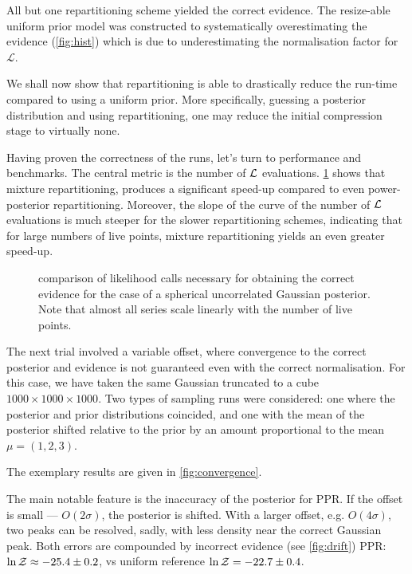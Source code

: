 \documentclass[usenatbib]{mnras}
\begin{document}
All but one repartitioning scheme yielded the correct evidence. The
resize-able uniform prior model was constructed to systematically
overestimating the evidence (\cref{fig:hist}) which is due to
underestimating the normalisation factor for
\(\mathcal{L}\).


We shall now show that repartitioning is able to drastically reduce
the run-time compared to using a uniform prior. More specifically,
guessing a posterior distribution and using repartitioning, one may
reduce the initial compression stage to virtually none.

Having proven the correctness of the runs, let's turn to performance
and benchmarks. The central metric is the number of \({\cal L}\)
evaluations. \cref{fig:benchmark} shows that mixture
repartitioning, produces a significant speed-up compared to even
power-posterior repartitioning. Moreover, the slope of the curve of
the number of \({\cal L}\) evaluations is much steeper for the
slower repartitioning schemes, indicating that for large numbers of
live points, mixture repartitioning yields an even greater
speed-up.



\begin{figure}
  
\caption{comparison of likelihood calls necessary for obtaining the correct evidence for the case of a spherical uncorrelated Gaussian posterior. Note that almost all series scale linearly with the number of live points. \label{fig:benchmark}}
\end{figure}




The next trial involved a variable offset, where convergence to the
correct posterior and evidence is not guaranteed even with the correct
normalisation. For this case, we have taken the same Gaussian
truncated to a cube \(1000\times1000\times1000\). Two types of
sampling runs were considered: one where the posterior and prior
distributions coincided, and one with the mean of the posterior
shifted relative to the prior by an amount proportional to the mean
$\mu = (1,2,3)$.

The exemplary results are given in \cref{fig:convergence}.

The main notable feature is the inaccuracy of the posterior for
PPR. If the offset is small --- \(O(2\sigma)\), the posterior is
shifted. With a larger offset, e.g. \(O(4\sigma)\), two peaks can be
resolved, sadly, with less density near the correct Gaussian
peak. Both errors are compounded by incorrect evidence (see
\cref{fig:drift}) PPR: \(\ln {\cal Z}\approx -25.4 \pm 0.2\), vs
uniform reference \(\ln {\cal Z} = -22.7 \pm 0.4\).
\end{document}
